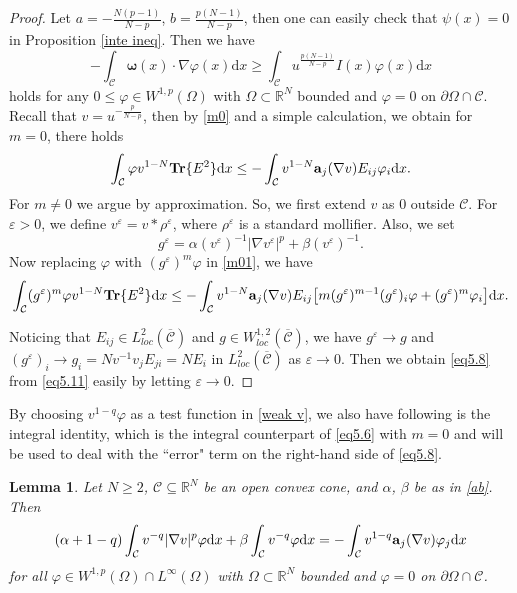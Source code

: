 \documentclass[12pt]{amsart}
\newtheorem{lem}[thm]{Lemma}
\theoremstyle{definition}
\theoremstyle{remark}
\theoremstyle{conclusion}
\theoremstyle{conjecture}
\numberwithin{equation}{section}
\begin{document}
\begin{proof}
Let $a=-\frac{N(p-1)}{N-p}$, $b=\frac{p(N-1)}{N-p}$, then one can easily check that $\psi(x)=0$ in Proposition \ref{inte ineq}. Then we have
\begin{equation}\label{m0}
 - \int_{\mathcal{C}}\bm{\omega}(x)\cdot\nabla\varphi(x)\mathrm{d}x\geq\int_{\mathcal{C}}u^{\frac{p(N-1)}{N-p}}I(x)\varphi(x)\mathrm{d}x
\end{equation}
holds for any $0\leq\varphi\in W^{1,p}(\Omega)$ with $\Omega\subset\mathbb{R}^{N}$ bounded and $\varphi=0$ on $\partial\Omega\cap\mathcal{C}$. Recall that $v=u^{-\frac{p}{N-p}}$, then by \eqref{m0} and a simple calculation, we obtain  for $m=0$, there holds
\begin{equation}\label{m01}
 \int_{\mathcal{C}}\varphi v^{1-N}\mathbf{Tr}\{E^2\} \mathrm{d}x\leq -\int_{\mathcal{C}} v^{1-N}{\bf{a}}_j(\nabla v)E_{ij}\varphi_i\mathrm{d}x .
\end{equation}
For $m\neq 0$ we argue by approximation. So, we first extend $v$ as $0$ outside $\mathcal{C}$. For $\varepsilon>0$, we define $v^{\varepsilon}=v\ast \rho^{\varepsilon}$, where $\rho^{\varepsilon}$ is a standard mollifier. Also, we set
 $$g^{\varepsilon}=\alpha(v^{\varepsilon})^{-1}|\nabla v^{\varepsilon}|^p +\beta(v^{\varepsilon})^{-1}.$$
Now replacing $\varphi$ with $(g^{\varepsilon})^m\varphi$ in \eqref{m01}, we have
\begin{equation}\label{eq5.11}
 \int_{\mathcal{C}}(g^{\varepsilon})^m\varphi v^{1-N}\mathbf{Tr}\{E^2\}\mathrm{d}x
 \leq -\int_{\mathcal{C}} v^{1-N}{\bf{a}}_j(\nabla v)E_{ij}\big[m(g^{\varepsilon})^{m-1}(g^{\varepsilon})_i\varphi+(g^{\varepsilon})^m\varphi_i\big]\mathrm{d}x.
\end{equation}

Noticing that $E_{ij}\in L^{2}_{loc}(\overline{\mathcal{C}})$ and $g\in W^{1,2}_{loc}(\overline{\mathcal{C}})$,
we have $g^{\varepsilon}\rightarrow g$ and $(g^{\varepsilon})_i\rightarrow g_i=Nv^{-1}v_jE_{ji}=NE_i$ in $L^{2}_{loc}(\overline{\mathcal{C}})$ as  $\varepsilon\rightarrow 0$.
 Then we obtain \eqref{eq5.8} from \eqref{eq5.11} easily by letting $\varepsilon\rightarrow 0$.
\end{proof}


By choosing $v^{1-q}\varphi$ as a test function in \eqref{weak v}, we also have following is the integral identity, which is the integral counterpart of \eqref{eq5.6} with $m=0$ and will be used to deal with the ``error" term on the right-hand side of \eqref{eq5.8}.

\begin{lem}\label{lem5}
Let $N\geq2$, $\mathcal{C}\subseteq\mathbb{R}^{N}$ be an open convex cone, and $\alpha$, $\beta$ be as in \eqref{ab}. Then
\begin{equation}\label{eq:5.12}
(\alpha+1-q)\int_{\mathcal{C}}v^{-q}|\nabla v|^p\varphi\mathrm{d}x +\beta\int_{\mathcal{C}} v^{-q}\varphi\mathrm{d}x = -\int_{\mathcal{C}} v^{1-q} {\bf{a}}_j(\nabla v)\varphi_j \mathrm{d}x
\end{equation}
for all $\varphi\in W^{1,p}(\Omega)\cap L^{\infty}(\Omega)$ with $\Omega\subset\mathbb{R}^N$ bounded and $\varphi=0$ on $\partial\Omega\cap\mathcal{C}$.
\end{lem}
\end{document}

